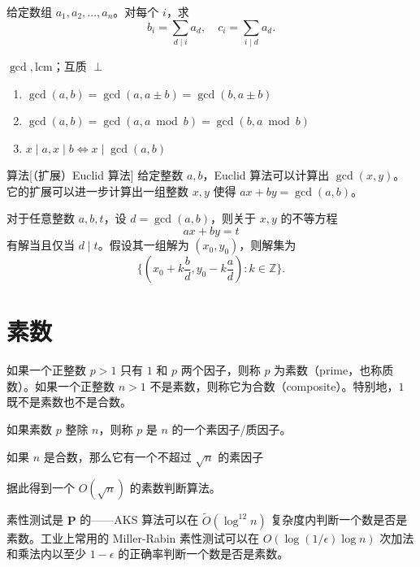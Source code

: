 \begin{example}[约数与倍数位置求和]
    给定数组 $a_1,a_2,\ldots,a_n$。对每个 $i$，求
    $$
    b_i=\sum_{d\mid i}a_d,\quad c_i=\sum_{i\mid d}a_d.
    $$
\end{example}

\begin{definition}
    $\gcd,\mathrm{lcm}$；互质 $\perp$
\end{definition}

\begin{property}
\begin{enumerate}
    \item $\gcd(a,b)=\gcd(a,a\pm b)=\gcd(b,a\pm b)$
    \item $\gcd(a,b)=\gcd(a,a\bmod b)=\gcd(b,a\bmod b)$
    \item $x\mid a,x\mid b\Leftrightarrow x\mid \gcd(a,b)$
\end{enumerate}
\end{property}

\begin{descbox}{算法}[（扩展）Euclid 算法]
    给定整数 $a,b$，Euclid 算法可以计算出 $\gcd(x,y)$。它的扩展可以进一步计算出一组整数 $x,y$ 使得 $ax+by=\gcd(a,b)$。
\end{descbox}

\begin{theorem}[Bézout 定理]
    对于任意整数 $a,b,t$，设 $d=\gcd(a,b)$，则关于 $x,y$ 的不等方程
    $$
    ax+by=t
    $$
    有解当且仅当 $d\mid t$。假设其一组解为 $(x_0,y_0)$，则解集为
    $$
    \{(x_0+k\frac{b}{d}, y_0-k\frac{a}{d}): k\in\mathbb{Z}\}.
    $$
\end{theorem}

\section{素数}

如果一个正整数 $p>1$ 只有 $1$ 和 $p$ 两个因子，则称 $p$ 为素数（prime，也称质数）。如果一个正整数 $n>1$ 不是素数，则称它为合数（composite）。特别地，$1$ 既不是素数也不是合数。

如果素数 $p$ 整除 $n$，则称 $p$ 是 $n$ 的一个素因子/质因子。

\begin{fact}
    如果 $n$ 是合数，那么它有一个不超过 $\sqrt{n}$ 的素因子
\end{fact}
\begin{exercise}[素性测试]
    据此得到一个 $O(\sqrt{n})$ 的素数判断算法。
\end{exercise}
\begin{remark}
    素性测试是 $\mathbf P$ 的——AKS 算法可以在 $\tilde O(\log^{12} n)$ 复杂度内判断一个数是否是素数。工业上常用的 Miller-Rabin 素性测试可以在 $O(\log(1/\epsilon)\log n)$ 次加法和乘法内以至少 $1-\epsilon$ 的正确率判断一个数是否是素数。
\end{remark}



